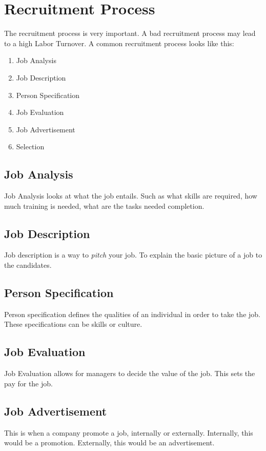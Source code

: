 \documentclass{standalone}
\begin{document}
\section{Recruitment Process}
The recruitment process is very important.
A bad recruitment process may lead to a high Labor Turnover.
A common recruitment process looks like this: 
\begin{enumerate}
	\item Job Analysis
	\item Job Description
	\item Person Specification
	\item Job Evaluation
	\item Job Advertisement
	\item Selection
\end{enumerate}

\subsection{Job Analysis}
Job Analysis looks at what the job entails.
Such as what skills are required, how much training is needed, what are the tasks needed completion.

\subsection{Job Description}
Job description is a way to \textit{pitch} your job.
To explain the basic picture of a job to the candidates.

\subsection{Person Specification}
Person specification defines the qualities of an individual in order to take the job.
These specifications can be skills or culture.

\subsection{Job Evaluation}
Job Evaluation allows for managers to decide the value of the job.
This sets the pay for the job.

\subsection{Job Advertisement}
This is when a company promote a job, internally or externally.
Internally, this would be a promotion.
Externally, this would be an advertisement.
\end{document}
